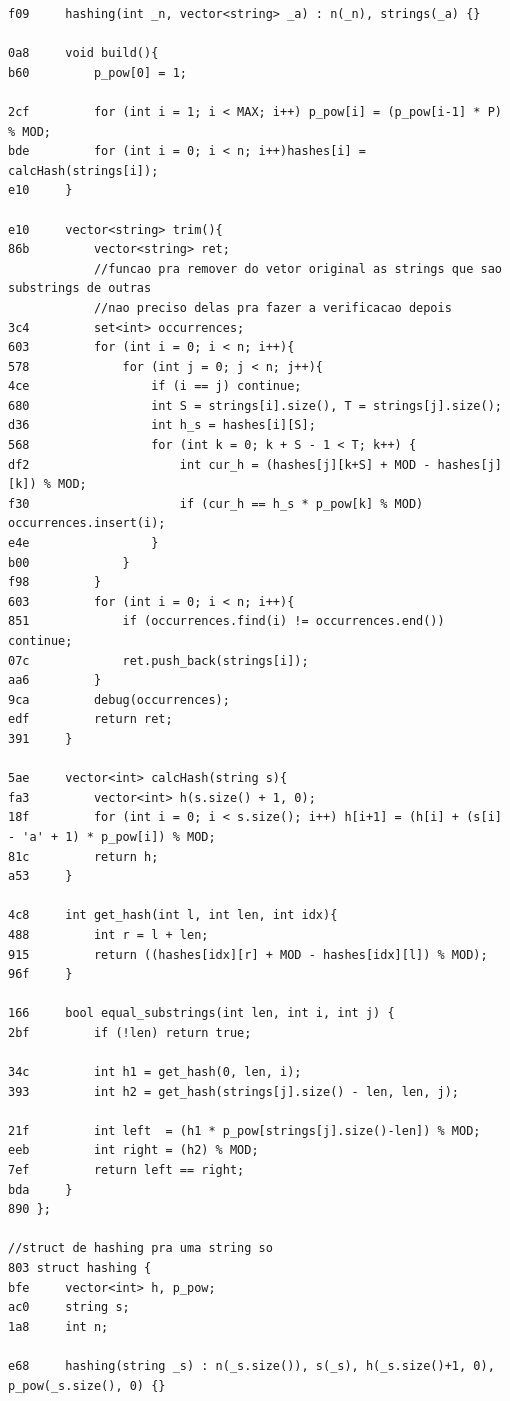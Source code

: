 \documentclass[11pt, a4paper, twoside]{article}
\begin{document}
\begin{lstlisting}
f09     hashing(int _n, vector<string> _a) : n(_n), strings(_a) {} 
    
0a8     void build(){
b60         p_pow[0] = 1; 
    
2cf         for (int i = 1; i < MAX; i++) p_pow[i] = (p_pow[i-1] * P) % MOD;
bde         for (int i = 0; i < n; i++)hashes[i] = calcHash(strings[i]);
e10     }
    
e10     vector<string> trim(){
86b         vector<string> ret;
            //funcao pra remover do vetor original as strings que sao substrings de outras
            //nao preciso delas pra fazer a verificacao depois
3c4         set<int> occurrences;
603         for (int i = 0; i < n; i++){
578             for (int j = 0; j < n; j++){
4ce                 if (i == j) continue;
680                 int S = strings[i].size(), T = strings[j].size();
d36                 int h_s = hashes[i][S];
568                 for (int k = 0; k + S - 1 < T; k++) {
df2                     int cur_h = (hashes[j][k+S] + MOD - hashes[j][k]) % MOD;
f30                     if (cur_h == h_s * p_pow[k] % MOD) occurrences.insert(i);
e4e                 }
b00             }
f98         }
603         for (int i = 0; i < n; i++){
851             if (occurrences.find(i) != occurrences.end()) continue;
07c             ret.push_back(strings[i]);
aa6         }
9ca         debug(occurrences);
edf         return ret;
391     }
        
5ae     vector<int> calcHash(string s){
fa3         vector<int> h(s.size() + 1, 0); 
18f         for (int i = 0; i < s.size(); i++) h[i+1] = (h[i] + (s[i] - 'a' + 1) * p_pow[i]) % MOD;
81c         return h;
a53     }
        
4c8     int get_hash(int l, int len, int idx){
488         int r = l + len;
915         return ((hashes[idx][r] + MOD - hashes[idx][l]) % MOD);
96f     }
    
166     bool equal_substrings(int len, int i, int j) {
2bf         if (!len) return true;
    
34c         int h1 = get_hash(0, len, i);
393         int h2 = get_hash(strings[j].size() - len, len, j);
    
21f         int left  = (h1 * p_pow[strings[j].size()-len]) % MOD;
eeb         int right = (h2) % MOD;
7ef         return left == right;
bda     }
890 };

//struct de hashing pra uma string so
803 struct hashing {
bfe     vector<int> h, p_pow;
ac0     string s;
1a8     int n;
        
e68     hashing(string _s) : n(_s.size()), s(_s), h(_s.size()+1, 0), p_pow(_s.size(), 0) {} 
    

\end{lstlisting}
\end{document}
